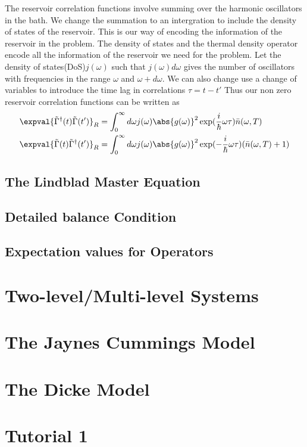 \documentclass{scrartcl}
\newcommand{\1}{\mathbbm{1}}
\newcommand{\iG}{\tilde{\Gamma}}
\newcommand{\nbar}{\bar{n}}
\begin{document}
The reservoir correlation functions involve summing over the harmonic oscillators in the bath. We change the summation
to an intergration to include the density of states of the reservoir. This is our way of encoding the
information of the reservoir in the problem. The density of states and the thermal density operator encode
all the information of the reservoir we need for the problem. Let the density of states(DoS)\(j(\omega)\) such that
\(j(\omega) d\omega\) gives the number of oscillators with frequencies in the range \(\omega\) and \(\omega + d\omega\). We can also
change use a change of variables to introduce the time lag in correlations \(\tau = t-t'\)
Thus our non zero reservoir correlation functions can be written as
\begin{align}
	\expval{\iG^\dagger(t)\iG(t')}_R & = \int_0^\infty d\omega j(\omega) \abs{g(\omega)}^2 \exp(\frac{i}{\hbar} \omega \tau) \nbar(\omega,T) \label{eq: rescorr1}\\
	\expval{\iG(t)\iG^\dagger(t')}_R & = \int_0^\infty d\omega j(\omega) \abs{g(\omega)}^2 \exp(-\frac{i}{\hbar} \omega \tau) (\nbar(\omega,T)+1)
\end{align}


\subsection{The Lindblad Master Equation}
\subsection{Detailed balance Condition}
\subsection{Expectation values for Operators}
\section{Two-level/Multi-level Systems}
\section{The Jaynes Cummings Model}
\section{The Dicke Model}
\section{Tutorial 1}
\end{document}
